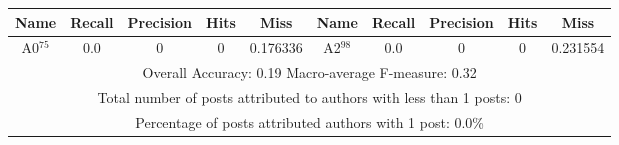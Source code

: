 \begin{tabular}{|c|c|c|c|c||c|c|c|c|c|}
\hline 
Name & Recall & Precision & Hits & Miss &Name & Recall & Precision & Hits & Miss \\ 
\hline 
A0$^{75}$ & 0.0 & 0 & 0 & 0.176336 & A2$^{98}$ & 0.0 & 0 & 0 & 0.231554 \\ 
\hline 
\multicolumn{10}{|c|}{Overall Accuracy: 0.19 Macro-average F-measure: 0.32}\\ 
\multicolumn{10}{|c|}{Total number of posts attributed to authors with less than 1 posts: 0}\\ 
\multicolumn{10}{|c|}{Percentage of posts attributed authors with 1 post: 0.0\%}\\ 
\hline 
\end{tabular}